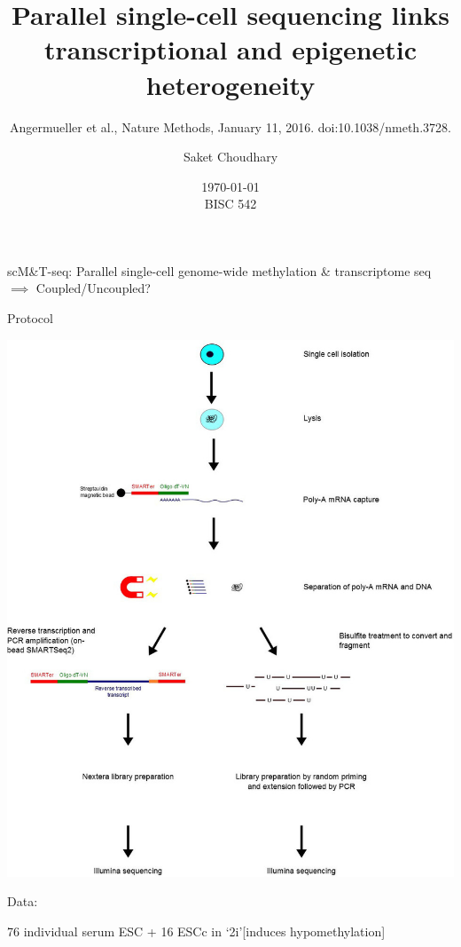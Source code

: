 \documentclass[10pt, compress]{beamer}
\title{Parallel single-cell sequencing links transcriptional and epigenetic heterogeneity
	}
\subtitle{Angermueller et al., Nature Methods, January 11, 2016. doi:10.1038/nmeth.3728.}
\author[skc]{Saket Choudhary}
\date{%
\today \\
BISC 542}
\renewcommand{\(}{\begin{columns}}
\renewcommand{\)}{\end{columns}}
\newcommand{\<}[1]{\begin{column}{#1}}
\renewcommand{\>}{\end{column}}
\begin{document}
\maketitle


\begin{frame}[fragile]
\begin{center}
\Large scM\&T-seq: Parallel single-cell genome-wide methylation \& transcriptome seq\\ 
$\implies$ Coupled/Uncoupled?
\end{center}
\end{frame}

\begin{frame}[fragile]
	\centering \Large Protocol
	\vspace*{-7pt}
	\begin{center}
	\includegraphics[width=\linewidth,height=\textheight,keepaspectratio]{images/protocol}
\end{center}
\end{frame}

\begin{frame}[fragile]
	\begin{center} \Huge Data:\end{center}
	\begin{center}
\Large 	76 individual serum ESC + 16 ESCc in `2i'[induces hypomethylation]
\end{center}
\end{frame}
\end{document}
